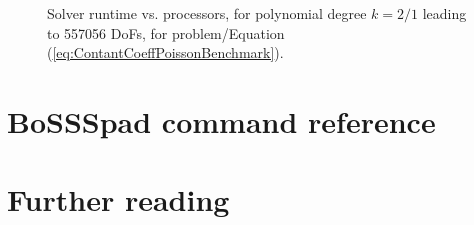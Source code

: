 \documentclass[a4paper,10pt]{report} %
\begin{document}
\graphicspath{{./apdx-MPISolverPerformance/strongScaling/NSESphereComplex/plots/}}

\begin{figure}[h!]
	\begin{center}
		
	\end{center}
	\caption{
		Solver runtime vs. processors, for polynomial degree $k=2/1$ leading to 557056 DoFs,
		for problem/Equation (\ref{eq:ContantCoeffPoissonBenchmark}).
	}
	\label{fig:Spherek1Time}
\end{figure}

\chapter{BoSSSpad command reference}
\label{sec:BoSSSpadReference}

\renewcommand{\ttdefault}{pcr} %




\chapter{Further reading}

\printbibliography[heading=subbibliography,title={Bibliography}]

\begin{refsection}[BoSSSArticles]
\nocite{*}
\printbibliography[heading=subbibliography,title={Peer-reviewed journal publications related to \BoSSS{}}]
\end{refsection}

\begin{refsection}[BoSSSPhDTheses]
\nocite{*}
\printbibliography[heading=subbibliography,title={PhD theses related to \BoSSS{}}]
\end{refsection}

\begin{refsection}[BoSSSStudentTheses]
\nocite{*}
\printbibliography[heading=subbibliography,title={Master and Bachelor theses related to \BoSSS{}}]
\end{refsection}
\end{document}
